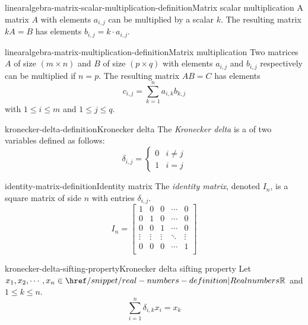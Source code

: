\documentclass[preview]{standalone}
\begin{document}
\begin{snippetdefinition}{linearalgebra-matrix-scalar-multiplication-definition}{Matrix scalar multiplication}
    A matrix \(A\) with elements \(a_{i,j}\)
    can be multiplied by a scalar \(k\).
    The resulting matrix \(kA=B\) has elements
    \(b_{i,j} = k \cdot a_{i,j}\).
\end{snippetdefinition}

\begin{snippetdefinition}{linearalgebra-matrix-multiplication-definition}{Matrix multiplication}
    Two matrices \(A\) of size \((m \times n)\) and
    \(B\) of size \((p \times q)\)
    with elements \(a_{i,j}\) and \(b_{i,j}\) respectively
    can be multiplied if \(n=p\).
    The resulting matrix \(AB=C\) has elements
    \[
        c_{i,j} = \sum_{k=1}^n
        a_{i,k}b_{k,j}
    \]
    with \(1 \leq i \leq m\)
    and \(1 \leq j \leq q\).
\end{snippetdefinition}

\begin{snippetdefinition}{kronecker-delta-definition}{Kronecker delta}
    The \textit{Kronecker delta} is a \function of two variables
    defined as follows:
    \[
        \delta_{i,j} = \begin{cases}
            0 & i \neq j \\
            1 & i = j
        \end{cases}
    \]
\end{snippetdefinition}

\begin{snippetdefinition}{identity-matrix-definition}{Identity matrix}
    The \textit{identity matrix}, denoted \(I_n\),
    is a square matrix of side \(n\)
    with entries \(\delta_{i,j}\).
    \[
    I_n=
        \begin{bmatrix}
            1 & 0 & 0 & \cdots & 0 \\
            0 & 1 & 0 & \cdots & 0 \\
            0 & 0 & 1 & \cdots & 0 \\
            \vdots & \vdots & \vdots & \ddots & \vdots \\
            0 & 0 & 0 & \cdots & 1 \\
        \end{bmatrix}
    \]
\end{snippetdefinition}

\begin{snippetproposition}{kronecker-delta-sifting-property}{Kronecker delta sifting property}
    Let \(x_1, x_2, \cdots, x_n \in \realnumbers\)
    and \(1 \leq k \leq n\).
    \[
        \sum_{i=1}^n \delta_{i,k}x_i = x_k
    \]
\end{snippetproposition}
\end{document}
